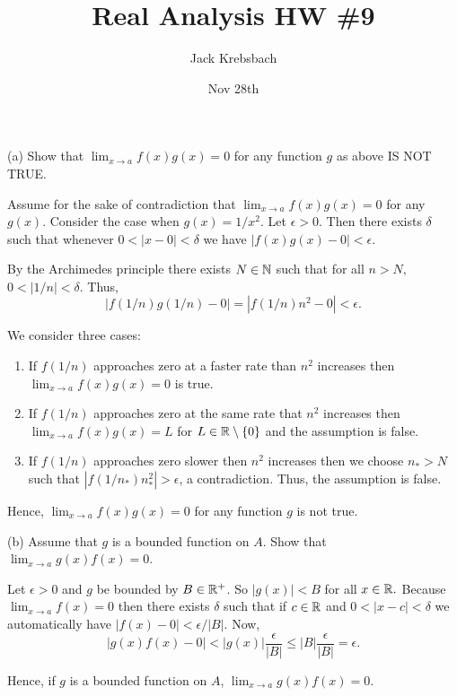 \documentclass{report}
\title{Real Analysis HW \#9}
\author{Jack Krebsbach }
\date{Nov 28th}
\begin{document}
\maketitle


(a) Show that $\lim _{x \rightarrow a} f(x) g(x)=0$ for any function $g$ as above IS NOT TRUE.

\begin{myproof}
     Assume for the sake of contradiction that $\lim _{x \rightarrow a} f(x) g(x)=0$ for  any $g(x).$ Consider the case when $g(x)= 1/x^2.$ Let $\epsilon >0.$ Then there exists $\delta$ such that whenever $0 < |x - 0| < \delta$ we have $|f(x)g(x) -0|<\epsilon.$

  By the Archimedes principle there exists $N \in \NN$ such that for all $n > N,$ $0 < |1/n| < \delta.$ Thus, $$ |f(1/n)g(1/n)-0|=|f(1/n)n^2 -0|<\epsilon.$$

  We consider three cases:

  \begin{enumerate}
    \item If $f(1/n)$ approaches zero at a faster rate than $n^2$ increases then $\lim _{x \rightarrow a} f(x) g(x)=0$ is true.
    \item If $f(1/n)$ approaches zero at the same rate that $n^2$ increases then $\lim _{x \rightarrow a} f(x) g(x)=L$ for $L \in \RR \setminus \{0\}$ and the assumption is false.
    \item   If $f(1/n)$ approaches zero slower then $n^2$ increases then we  choose $n_* > N$ such that $ |f(1/n_*)n_*^2| > \epsilon$, a contradiction. Thus, the assumption is false.
   \end{enumerate}
Hence, $\lim _{x \rightarrow a} f(x) g(x)=0$ for any function $g$ is not true.

\end{myproof}

\bigskip
\bigskip
\bigskip

(b) Assume that $g$ is a bounded function on $A$. Show that $\lim _{x \rightarrow a} g(x) f(x)=0$.

\begin{myproof}
    Let $\epsilon >0$ and $g$ be bounded by $B \in \RR^+$. So $|g(x)| < B$ for all $x \in \RR.$ Because $\lim _{x \rightarrow a} f(x)=0$ then there exists $\delta$ such that if $c\in \RR$ and $0 < | x -c | <\delta$ we automatically have $|f(x) - 0| <  \epsilon / |B|$.
Now, $$ |g(x)f(x) - 0| < |g(x)|\frac{\epsilon}{\left|B\right|} \leq |B|\frac{\epsilon}{\left|B\right|}  = \epsilon.  $$

Hence, if $g$ is a bounded function on $A$, $\lim _{x \rightarrow a} g(x) f(x)=0.$
\end{myproof}
\end{document}
